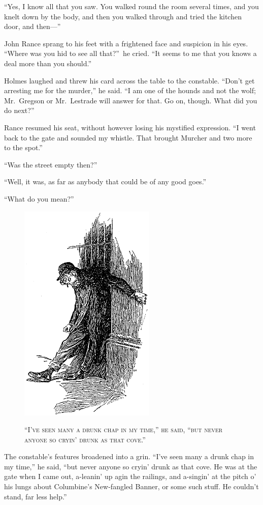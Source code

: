 \documentclass[12pt,english,oneside]{book}
\newcommand{\noun}[1]{\textsc{#1}}
\newcommand{\mdsh}[1]{\mbox{#1}\linebreak[1]}
\begin{document}
{}``Yes, I know all that you saw. You walked round the room several
times, and you knelt down by the body, and then you walked through
and tried the kitchen door, and \mdsh{then\mdsh{---}''}

John Rance sprang to his feet with a frightened face and suspicion
in his eyes. {}``Where was you hid to see all that?''\ he cried.
{}``It seems to me that you knows a deal more than you should.''

Holmes laughed and threw his card across the table to the constable.
{}``Don't get arresting me for the murder,'' he said. {}``I am
one of the hounds and not the wolf; Mr.\ Gregson or Mr.\ Lestrade
will answer for that. Go on, though. What did you do next?''

Rance resumed his seat, without however losing his mystified expression.
{}``I went back to the gate and sounded my whistle. That brought
Murcher and two more to the spot.''

{}``Was the street empty then?''

{}``Well, it was, as far as anybody that could be of any good goes.''

{}``What do you mean?''

%
\begin{figure}[htbp]
\noindent \begin{center}\includegraphics{images/study10-stud-08.png}\end{center}

\noindent \begin{center}\noun{{}``I've seen many a drunk chap in
my time,'' he said, {}``but never anyone so cryin' drunk as that
cove.''}\end{center}
\end{figure}
The constable's features broadened into a grin. {}``I've seen many
a drunk chap in my time,'' he said, {}``but never anyone so cryin'
drunk as that cove. He was at the gate when I came out, a-leanin'
up agin the railings, and a-singin' at the pitch o' his lungs about
Columbine's New-fangled Banner, or some such stuff. He couldn't stand,
far less help.''
\end{document}
